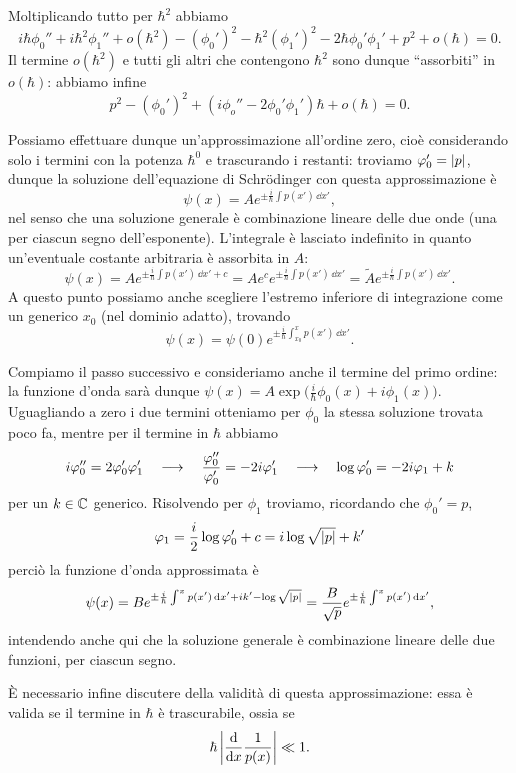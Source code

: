 Moltiplicando tutto per $\hbar^2$ abbiamo
\begin{equation}
	i\hbar\phi_0''+i\hbar^2\phi_1''+o(\hbar^2)-(\phi_0')^2-\hbar^2(\phi_1')^2-2\hbar\phi_0'\phi_1'+p^2+o(\hbar)=0.
\end{equation}
Il termine $o(\hbar^2)$ e tutti gli altri che contengono $\hbar^2$ sono dunque ``assorbiti'' in $o(\hbar)$: abbiamo infine
\begin{equation}
	p^2-(\phi_0')^2+(i\phi_o''-2\phi_0'\phi_1')\hbar+o(\hbar)=0.
	\label{eq:WKB-schroedinger-approssimata}
\end{equation}

Possiamo effettuare dunque un'approssimazione all'ordine zero, cioè considerando solo i termini con la potenza $\hbar^0$ e trascurando i restanti: troviamo $\varphi_0'=\left|{p}\right|$, dunque la soluzione dell'equazione di Schr\"odinger con questa approssimazione è
\begin{equation}
	\psi(x)=Ae^{\pm\frac{i}{\hbar}\int p(x')\,\dd x'},
	\label{eq:soluzione-WKB-ordine-0}
\end{equation}
nel senso che una soluzione generale è combinazione lineare delle due onde (una per ciascun segno dell'esponente).
L'integrale è lasciato indefinito in quanto un'eventuale costante arbitraria è assorbita in $A$:
\begin{equation}
	\psi(x)=Ae^{\pm\frac{i}{\hbar}\int p(x')\,\dd x'+c}=Ae^ce^{\pm\frac{i}{\hbar}\int p(x')\,\dd x'}=\tilde{A}e^{\pm\frac{i}{\hbar}\int p(x')\,\dd x'}.
\end{equation}
A questo punto possiamo anche scegliere l'estremo inferiore di integrazione come un generico $x_0$ (nel dominio adatto), trovando
\begin{equation}
	\psi(x)=\psi(0)e^{\pm\frac{i}{\hbar}\int_{x_0}^x p(x')\,\dd x'}.
\end{equation}

Compiamo il passo successivo e consideriamo anche il termine del primo ordine: la funzione d'onda sarà dunque $\psi(x)=A\exp\big(\frac{i}{\hbar}\phi_0(x)+i\phi_1(x)\big)$.
Uguagliando a zero i due termini otteniamo per $\phi_0$ la stessa soluzione trovata poco fa, mentre per il termine in $\hbar$ abbiamo
\begin{equation}
	i\varphi_0''=2\varphi_0'\varphi_1'\quad\longrightarrow\quad \frac{\varphi_0''}{\varphi_0'}=-2i\varphi_1'\quad\longrightarrow\quad \log\varphi_0'=-2i\varphi_1+k
\end{equation}
per un $k\in\mathbb{C}$ generico.
Risolvendo per $\phi_1$ troviamo, ricordando che $\phi_0'=p$,
\begin{equation}
	\varphi_1=\frac{i}2\log\varphi_0'+c=i\log\sqrt{\left|{p}\right|}+k'
\end{equation}
perciò la funzione d'onda approssimata è
\begin{equation}
	\psi(x)=Be^{\pm\frac{i}{\hbar}\int^xp(x')\,\textup{d} x'+ik'-\log\sqrt{\left|{p}\right|}}=\frac{B}{\sqrt{p}}e^{\pm\frac{i}{\hbar}\int^xp(x')\,\textup{d} x'},
	\label{eq:soluzione-WKB-ordine-1}
\end{equation}
intendendo anche qui che la soluzione generale è combinazione lineare delle due funzioni, per ciascun segno.

È necessario infine discutere della validità di questa approssimazione: essa è valida se il termine in $\hbar$ è trascurabile, ossia se
\begin{equation}
	\hbar\left|{\frac{\textup{d} {}}{\textup{d} {x}}\frac1{p(x)}}\right|\ll 1.
	\label{eq:condizione-approssimazione-WKB}
\end{equation}

